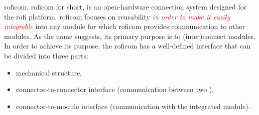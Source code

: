 \documentclass[
  digital,     %
  oneside,     %
  nosansbold,  %
  nocolorbold, %
  lof,         %
  lot,         %
]{fithesis4}
\newcommand{\TODO}[1]{\textcolor{red}{\textit{#1}}}
\begin{document}

\acrlong{roficom}, \acrshort{roficom} for short, is an open-hardware connection system designed for the \acrshort{rofi} platform. \acrshort{roficom} focuses on reusability \TODO{in order to make it easily integrable} into any module for which \acrshort{roficom} provides
communication to other modules. As the name suggests, its primary purpose is to (inter)connect modules. In order to achieve its purpose, the \acrshort{roficom} has a well-defined interface that can be divided into three parts:
\begin{itemize}
    \item mechanical structure,
    \item connector-to-connector interface (communication between two ),
    \item connector-to-module interface (communication with the integrated module).
\end{itemize}
\end{document}
